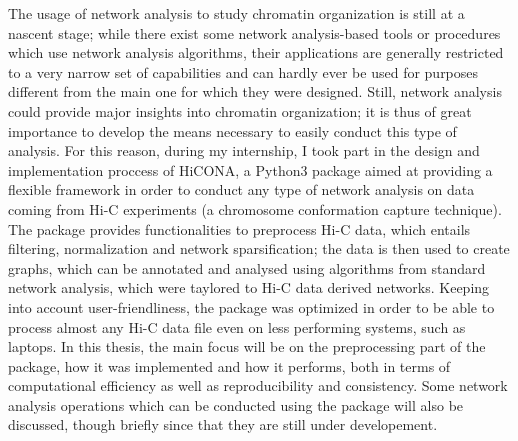 The usage of network analysis to study chromatin organization is still at a nascent stage; while there exist some network analysis-based tools or procedures which use network analysis algorithms, their applications are generally restricted to a very narrow set of capabilities and can hardly ever be used for purposes different from the main one for which they were designed. Still, network analysis could provide major insights into chromatin organization; it is thus of great importance to develop the means necessary to easily conduct this type of analysis. For this reason, during my internship, I took part in the design and implementation proccess of HiCONA, a Python3 package aimed at providing a flexible framework in order to conduct any type of network analysis on data coming from Hi-C experiments (a chromosome conformation capture technique). The package provides functionalities to preprocess Hi-C data, which entails filtering, normalization and network sparsification; the data is then used to create graphs, which can be annotated and analysed using algorithms from standard network analysis, which were taylored to Hi-C data derived networks. Keeping into account user-friendliness, the package was optimized in order to be able to process almost any Hi-C data file even on less performing systems, such as laptops. In this thesis, the main focus will be on the preprocessing part of the package, how it was implemented and how it performs, both in terms of computational efficiency as well as reproducibility and consistency. Some network analysis operations which can be conducted using the package will also be discussed, though briefly since that they are still under developement.
